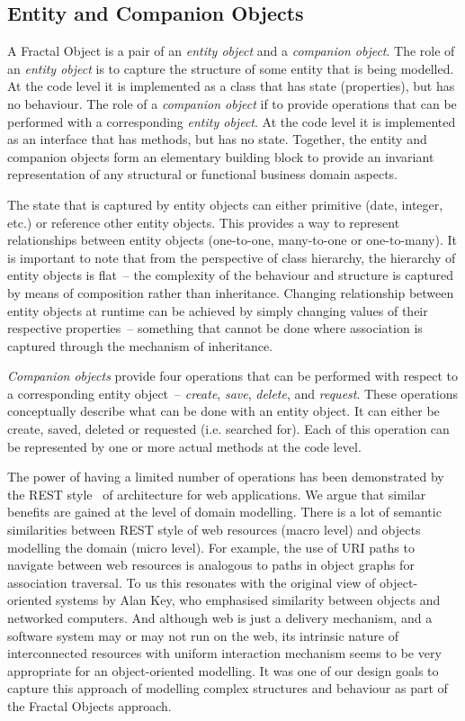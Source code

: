 \documentclass[a4paper,10pt,oneside,openright,final]{memoir} %
\begin{document}
  \subsection*{Entity and Companion Objects}

  A Fractal Object is a pair of an \emph{entity object} and a \emph{companion object}.
  The role of an \emph{entity object} is to capture the structure of some entity that is being modelled.
  At the code level it is implemented as a class that has state (properties), but has no behaviour.
  The role of a \emph{companion object} if to provide operations that can be performed with a corresponding \emph{entity object}.
  At the code level it is implemented as an interface that has methods, but has no state.
  Together, the entity and companion objects form an elementary building block to provide an invariant representation of any structural or functional business domain aspects.

  The state that is captured by entity objects can either primitive (date, integer, etc.) or reference other entity objects.
  This provides a way to represent relationships between entity objects (one-to-one, many-to-one or one-to-many).
  It is important to note that from the perspective of class hierarchy, the hierarchy of entity objects is flat~-- the complexity of the behaviour and structure is captured by means of composition rather than inheritance.  
  Changing relationship between entity objects at runtime can be achieved by simply changing values of their respective properties~-- something that cannot be done where association is captured through the mechanism of inheritance.
  
  \emph{Companion objects} provide four operations that can be performed with respect to a corresponding entity object~--  \emph{create}, \emph{save}, \emph{delete}, and \emph{request}.
  These operations conceptually describe what can be done with an entity object.
  It can either be create, saved, deleted or requested (i.e. searched for).
  Each of this operation can be represented by one or more actual methods at the code level.
    
  The power of having a limited number of operations has been demonstrated by the REST style~\cite{Fielding2000} of architecture for web applications.
  We argue that similar benefits are gained at the level of domain modelling.
  There is a lot of semantic similarities between REST style of web resources (macro level) and objects modelling the domain (micro level).
  For example, the use of URI paths to navigate between web resources is analogous to paths in object graphs for association traversal.
  To us this resonates with the original view of object-oriented systems by Alan Key, who emphasised similarity between objects and networked computers.
  And although web is just a delivery mechanism, and a software system may or may not run on the web, its intrinsic nature of interconnected resources with uniform interaction mechanism seems to be very appropriate for an object-oriented modelling.
  It was one of our design goals to capture this approach of modelling complex structures and behaviour as part of the Fractal Objects approach.
\end{document}
